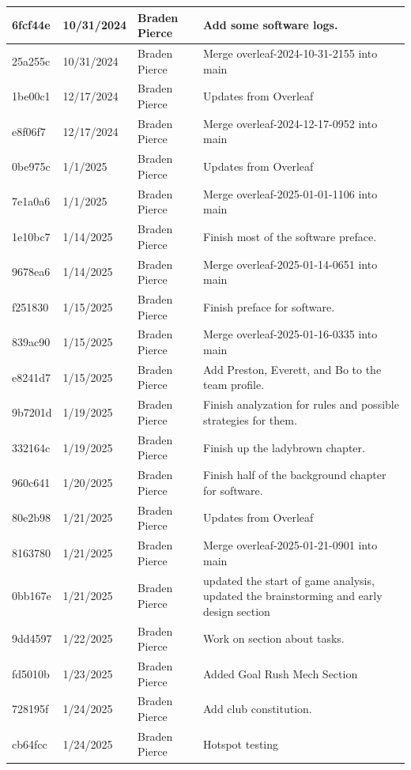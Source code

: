 \begin{center}
\begin{longtable}{|p{28pt}|p{33pt}|p{40pt}|p{300pt}|}
\hline
6fcf44e & 10/31/2024 & Braden Pierce & Add some software logs. \\
\hline
25a255c & 10/31/2024 & Braden Pierce & Merge overleaf-2024-10-31-2155 into main \\
\hline
1be00c1 & 12/17/2024 & Braden Pierce & Updates from Overleaf \\
\hline
e8f06f7 & 12/17/2024 & Braden Pierce & Merge overleaf-2024-12-17-0952 into main \\
\hline
0be975c & 1/1/2025 & Braden Pierce & Updates from Overleaf \\
\hline
7e1a0a6 & 1/1/2025 & Braden Pierce & Merge overleaf-2025-01-01-1106 into main \\
\hline
1e10bc7 & 1/14/2025 & Braden Pierce & Finish most of the software preface. \\
\hline
9678ea6 & 1/14/2025 & Braden Pierce & Merge overleaf-2025-01-14-0651 into main \\
\hline
f251830 & 1/15/2025 & Braden Pierce & Finish preface for software. \\
\hline
839ac90 & 1/15/2025 & Braden Pierce & Merge overleaf-2025-01-16-0335 into main \\
\hline
e8241d7 & 1/15/2025 & Braden Pierce & Add Preston, Everett, and Bo to the team profile. \\
\hline
9b7201d & 1/19/2025 & Braden Pierce & Finish analyzation for rules and possible strategies for them. \\
\hline
332164c & 1/19/2025 & Braden Pierce & Finish up the ladybrown chapter. \\
\hline
960c641 & 1/20/2025 & Braden Pierce & Finish half of the background chapter for software. \\
\hline
80e2b98 & 1/21/2025 & Braden Pierce & Updates from Overleaf \\
\hline
8163780 & 1/21/2025 & Braden Pierce & Merge overleaf-2025-01-21-0901 into main \\
\hline
0bb167e & 1/21/2025 & Braden Pierce & updated the start of game analysis, updated the brainstorming and early design section \\
\hline
9dd4597 & 1/22/2025 & Braden Pierce & Work on section about tasks. \\
\hline
fd5010b & 1/23/2025 & Braden Pierce & Added Goal Rush Mech Section \\
\hline
728195f & 1/24/2025 & Braden Pierce & Add club constitution. \\
\hline
cb64fcc & 1/24/2025 & Braden Pierce & Hotspot testing \\

\end{longtable}
\end{center}
